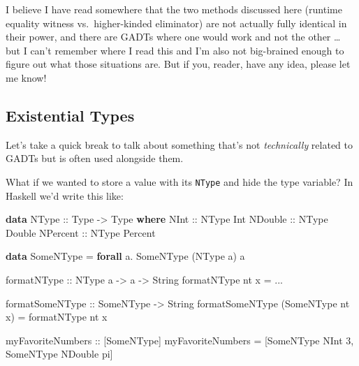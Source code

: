 \documentclass[]{article}
\newenvironment{Shaded}{}{}
\newcommand{\DataTypeTok}[1]{\textcolor[rgb]{0.56,0.13,0.00}{#1}}
\newcommand{\DecValTok}[1]{\textcolor[rgb]{0.25,0.63,0.44}{#1}}
\newcommand{\FunctionTok}[1]{\textcolor[rgb]{0.02,0.16,0.49}{#1}}
\newcommand{\KeywordTok}[1]{\textcolor[rgb]{0.00,0.44,0.13}{\textbf{#1}}}
\newcommand{\NormalTok}[1]{#1}
\newcommand{\OperatorTok}[1]{\textcolor[rgb]{0.40,0.40,0.40}{#1}}
\newcommand{\OtherTok}[1]{\textcolor[rgb]{0.00,0.44,0.13}{#1}}
\begin{document}
I believe I have read somewhere that the two methods discussed here (runtime
equality witness vs.~higher-kinded eliminator) are not actually fully identical
in their power, and there are GADTs where one would work and not the other
\ldots{} but I can't remember where I read this and I'm also not big-brained
enough to figure out what those situations are. But if you, reader, have any
idea, please let me know!

\subsection{Existential Types}\label{existential-types}

Let's take a quick break to talk about something that's not \emph{technically}
related to GADTs but is often used alongside them.

What if we wanted to store a value with its \texttt{NType} and hide the type
variable? In Haskell we'd write this like:

\begin{Shaded}
\begin{Highlighting}[]
\KeywordTok{data} \DataTypeTok{NType}\OtherTok{ ::} \DataTypeTok{Type} \OtherTok{{-}\textgreater{}} \DataTypeTok{Type} \KeywordTok{where}
    \DataTypeTok{NInt}\OtherTok{ ::} \DataTypeTok{NType} \DataTypeTok{Int}
    \DataTypeTok{NDouble}\OtherTok{ ::} \DataTypeTok{NType} \DataTypeTok{Double}
    \DataTypeTok{NPercent}\OtherTok{ ::} \DataTypeTok{NType} \DataTypeTok{Percent}

\KeywordTok{data} \DataTypeTok{SomeNType} \OtherTok{=} \KeywordTok{forall}\NormalTok{ a}\OperatorTok{.} \DataTypeTok{SomeNType}\NormalTok{ (}\DataTypeTok{NType}\NormalTok{ a) a}

\OtherTok{formatNType ::} \DataTypeTok{NType}\NormalTok{ a }\OtherTok{{-}\textgreater{}}\NormalTok{ a }\OtherTok{{-}\textgreater{}} \DataTypeTok{String}
\NormalTok{formatNType nt x }\OtherTok{=} \OperatorTok{...}

\OtherTok{formatSomeNType ::} \DataTypeTok{SomeNType} \OtherTok{{-}\textgreater{}} \DataTypeTok{String}
\NormalTok{formatSomeNType (}\DataTypeTok{SomeNType}\NormalTok{ nt x) }\OtherTok{=}\NormalTok{ formatNType nt x}

\OtherTok{myFavoriteNumbers ::}\NormalTok{ [}\DataTypeTok{SomeNType}\NormalTok{]}
\NormalTok{myFavoriteNumbers }\OtherTok{=}\NormalTok{ [}\DataTypeTok{SomeNType} \DataTypeTok{NInt} \DecValTok{3}\NormalTok{, }\DataTypeTok{SomeNType} \DataTypeTok{NDouble} \FunctionTok{pi}\NormalTok{]}
\end{Highlighting}
\end{Shaded}
\end{document}
